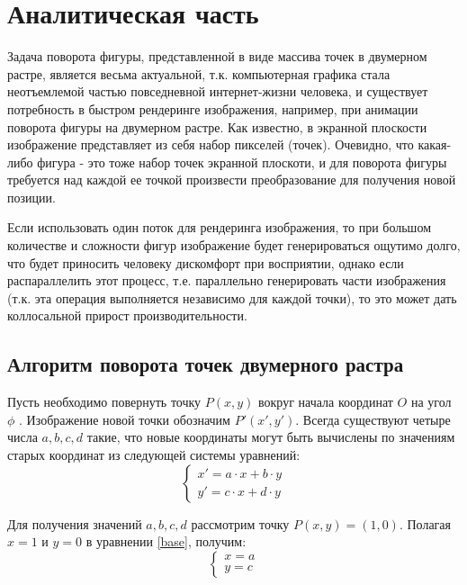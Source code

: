 \chapter{Аналитическая часть}

Задача поворота фигуры, представленной в виде массива точек
в двумерном растре, является весьма актуальной, т.к.  компьютерная графика стала неотъемлемой частью повседневной интернет-жизни человека, и существует потребность в быстром рендеринге изображения, например, при анимации поворота фигуры на двумерном растре. Как известно, в экранной плоскости изображение представляет из себя набор пикселей (точек). Очевидно, что какая-либо фигура - это тоже набор точек экранной плоскоти, и для поворота фигуры требуется над каждой ее точкой произвести преобразование для получения новой позиции.

Если использовать один поток для рендеринга изображения, то
при большом количестве и сложности фигур изображение будет генерироваться ощутимо долго, что будет приносить человеку дискомфорт при восприятии, однако если распараллелить этот процесс, т.е. параллельно генерировать части изображения (т.к. эта операция выполняется независимо для каждой точки), то это может дать коллосальной прирост производительности.

\section{Алгоритм поворота точек двумерного растра}

Пусть необходимо повернуть точку $P(x,y)$ вокруг начала координат $O$ на угол $\phi$ \cite{point_rotate}. Изображение новой точки обозначим $P'(x',y')$. Всегда существуют четыре числа $a,b,c,d$ такие, что 
новые координаты могут быть вычислены по значениям старых координат из следующей системы уравнений:
\begin{equation}
	\label{base}
	\begin{cases}
		x'=a\cdot x+b\cdot y
		\\
		y'=c\cdot x+d\cdot y
	\end{cases}
\end{equation}

Для получения значений $a,b,c,d$ рассмотрим точку $P(x,y) = (1,0)$. Полагая $x=1$ и $y=0$ в уравнении \ref{base}, получим:
\begin{equation}
	\label{next}
	\begin{cases}
		x = a
		\\
		y = c
	\end{cases}
\end{equation}


